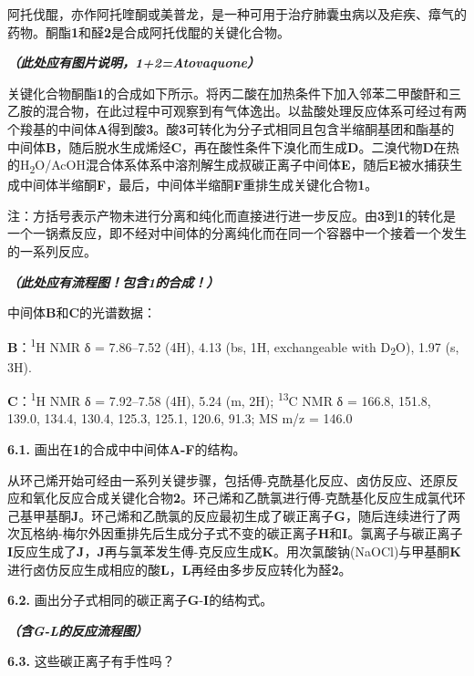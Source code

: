 阿托伐醌，亦作阿托喹酮或美普龙，是一种可用于治疗肺囊虫病以及疟疾、瘴气的药物。酮酯\textbf{1}和醛\textbf{2}是合成阿托伐醌的关键化合物。

\textbf{\emph{（此处应有图片说明，1+2=Atovaquone）}}

关键化合物酮酯\textbf{1}的合成如下所示。将丙二酸在加热条件下加入邻苯二甲酸酐和三乙胺的混合物，在此过程中可观察到有气体逸出。以盐酸处理反应体系可经过有两个羧基的中间体\textbf{A}得到酸\textbf{3}。酸\textbf{3}可转化为分子式相同且包含半缩酮基团和酯基的中间体\textbf{B}，随后脱水生成烯烃\textbf{C}，再在酸性条件下溴化而生成\textbf{D}。二溴代物\textbf{D}在热的H\textsubscript{2}O/AcOH混合体系体系中溶剂解生成叔碳正离子中间体\textbf{E}，随后\textbf{E}被水捕获生成中间体半缩酮\textbf{F}，最后，中间体半缩酮\textbf{F}重排生成关键化合物\textbf{1}。

注：方括号表示产物未进行分离和纯化而直接进行进一步反应。由\textbf{3}到\textbf{1}的转化是一个一锅煮反应，即不经对中间体的分离纯化而在同一个容器中一个接着一个发生的一系列反应。

\textbf{\emph{（此处应有流程图！包含1的合成！）}}

中间体\textbf{B}和\textbf{C}的光谱数据：

\textbf{B}：\textsuperscript{1}H NMR δ = 7.86--7.52 (4H), 4.13 (bs, 1H,
exchangeable with D\textsubscript{2}O), 1.97 (s, 3H).

\textbf{C}：\textsuperscript{1}H NMR δ = 7.92--7.58 (4H), 5.24 (m, 2H);
\textsuperscript{13}C NMR δ = 166.8, 151.8, 139.0, 134.4, 130.4, 125.3,
125.1, 120.6, 91.3; MS m/z = 146.0

\noindent\textbf{6.1.} 画出在\textbf{1}的合成中中间体\textbf{A-F}的结构。

从环己烯开始可经由一系列关键步骤，包括\protect\hypertarget{OLE_LINK2}{}{\protect\hypertarget{OLE_LINK3}{}{}}傅-克酰基化反应、卤仿反应、还原反应和氧化反应合成关键化合物\textbf{2}。环己烯和乙酰氯进行傅-克酰基化反应生成氯代环己基甲基酮\textbf{J}。环己烯和乙酰氯的反应最初生成了碳正离子\textbf{G}，随后连续进行了两次瓦格纳-梅尔外因重排先后生成分子式不变的碳正离子\textbf{H}和\textbf{I}。氯离子与碳正离子\textbf{I}反应生成了\textbf{J}，\textbf{J}再与氯苯发生傅-克反应生成\textbf{K}。用次氯酸钠(NaOCl)与甲基酮\textbf{K}进行卤仿反应生成相应的酸\textbf{L}，\textbf{L}再经由多步反应转化为醛\textbf{2}。

\noindent\textbf{6.2.} 画出分子式相同的碳正离子\textbf{G}-\textbf{I}的结构式。

\textbf{\emph{（含G-L的反应流程图）}}

\noindent\textbf{6.3.} 这些碳正离子有手性吗？

